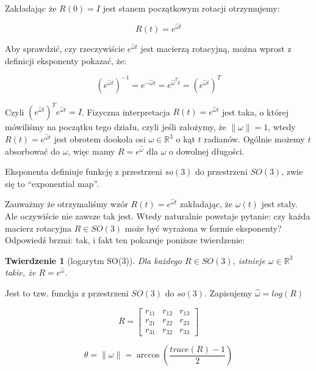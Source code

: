 \documentclass[a4paper,12pt]{article}
\newtheorem{theo}[defi]{Twierdzenie}
\newcommand{\RR}{\mathbb{R}^3}
\begin{document}
Zakładając że $R(0)=I$ jest stanem początkowym rotacji otrzymujemy:

\begin{equation}
R(t) = e^{\hat{\omega}t}
\end{equation}

Aby sprawdzić, czy rzeczywiście $e^{\hat{\omega}t}$ jest macierzą rotacyjną, można wprost z definicji eksponenty pokazać, że:

\begin{equation}
(e^{\hat{\omega}t})^{-1}=e^{-\hat{\omega}t}=e^{\hat{\omega}^Tt}=(e^{\hat{\omega}t})^T
\end{equation}

Czyli $(e^{\hat{\omega}t})^Te^{\hat{\omega}t}=I$. Fizyczna interpretacja $R(t) = e^{\hat{\omega}t}$ jest taka, o której mówiliśmy na początku tego działu, czyli jeśli założymy, że $\| \omega \| = 1$, wtedy $R(t)=e^{\hat{\omega}t}$ jest obrotem dookoła osi $\omega \in \RR$ o kąt $t$ radianów. Ogólnie możemy $t$ absorbować do $\omega$, więc mamy $R = e^{\hat{\omega}}$ dla $\omega$ o dowolnej długości.

Eksponenta definiuje funkcję z przestrzeni $so(3)$ do przestrzeni $SO(3)$, zwie się to ``exponential map''. 

Zauważmy że otrzymaliśmy wzór $R(t) = e^{\hat{\omega}t}$ zakładając, że $\omega(t)$ jest stały. Ale oczywiście nie zawsze tak jest. Wtedy naturalnie powstaje pytanie: czy każda macierz rotacyjna $R \in SO(3)$ może być wyrażona w formie eksponenty? Odpowiedź brzmi: tak, i fakt ten pokazuje poniższe twierdzenie:

\begin{theo}[logarytm SO(3)]
Dla każdego $R \in SO(3)$, istnieje $\omega \in \RR$ takie, że $R = e^{\hat{\omega}}$. 
\end{theo}

\noindent Jest to tzw. funckja z przestrzeni $SO(3)$ do $so(3)$. Zapisujemy $\hat{\omega} = log(R)$

\begin{equation}
R = 
\begin{bmatrix}
  r_{11} & r_{12} & r_{13} \\
  r_{21} & r_{22} & r_{23} \\
  r_{31} & r_{32} & r_{33}
\end{bmatrix}
\end{equation}

\begin{equation}
\theta = \| \omega \| = \arccos(\frac{trace(R)-1}{2})
\end{equation}
\end{document}

